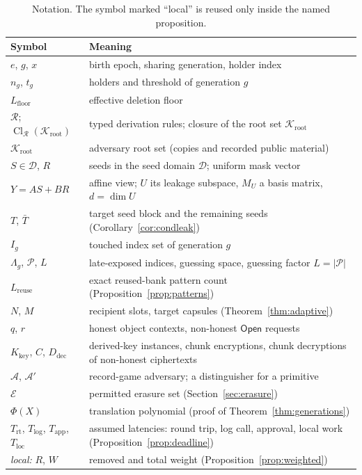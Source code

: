 \documentclass[pdflatex,sn-mathphys-num,twocolumn]{sn-jnl}
\theoremstyle{plain}
\theoremstyle{definition}
\newcommand{\Cl}{\operatorname{Cl}}
\begin{document}
\begin{table}[htbp]
\caption{Notation. The symbol marked ``local'' is reused only inside the named proposition.}\label{tab:notation}
\centering\footnotesize
\begin{tabularx}{\linewidth}{@{}>{\raggedright\arraybackslash}p{.27\linewidth}Y@{}}\toprule
Symbol & Meaning\\\midrule
$e$, $g$, $x$ & birth epoch, sharing generation, holder index\\
$n_g$, $t_g$ & holders and threshold of generation $g$\\
$L_{\mathrm{floor}}$ & effective deletion floor\\
$\mathcal R$; $\Cl_{\mathcal R}(\mathcal K_{\mathrm{root}})$ & typed derivation rules; closure of the root set $\mathcal K_{\mathrm{root}}$\\
$\mathcal K_{\mathrm{root}}$ & adversary root set (copies and recorded public material)\\
$S\in\mathcal D$, $R$ & seeds in the seed domain $\mathcal D$; uniform mask vector\\
$Y=AS+BR$ & affine view; $U$ its leakage subspace, $M_U$ a basis matrix, $d=\dim U$\\
$T$, $\bar T$ & target seed block and the remaining seeds (Corollary~\ref{cor:condleak})\\
$I_g$ & touched index set of generation $g$\\
$\Lambda_g$, $\mathcal P$, $L$ & late-exposed indices, guessing space, guessing factor $L=|\mathcal P|$\\
$L_{\mathrm{reuse}}$ & exact reused-bank pattern count (Proposition~\ref{prop:patterns})\\
$N$, $M$ & recipient slots, target capsules (Theorem~\ref{thm:adaptive})\\
$q$, $r$ & honest object contexts, non-honest $\mathsf{Open}$ requests\\
$K_{\mathrm{key}}$, $C$, $D_{\mathrm{dec}}$ & derived-key instances, chunk encryptions, chunk decryptions of non-honest ciphertexts\\
$\mathcal A$, $\mathcal A'$ & record-game adversary; a distinguisher for a primitive\\
$\mathcal E$ & permitted erasure set (Section~\ref{sec:erasure})\\
$\Phi(X)$ & translation polynomial (proof of Theorem~\ref{thm:generations})\\
$T_{\mathrm{rt}}$, $T_{\mathrm{log}}$, $T_{\mathrm{app}}$, $T_{\mathrm{loc}}$ & assumed latencies: round trip, log call, approval, local work (Proposition~\ref{prop:deadline})\\
\emph{local:} $R$, $W$ & removed and total weight (Proposition~\ref{prop:weighted})\\\bottomrule
\end{tabularx}
\end{table}
\end{document}
